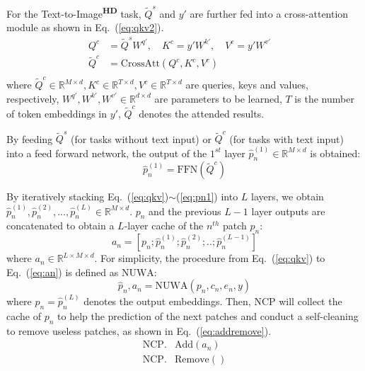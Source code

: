 \documentclass{article}
\begin{document}
For the Text-to-Image\textsuperscript{\textbf{HD}} task, $\tilde{Q}^s$ and $y'$ are further fed into a cross-attention module as shown in Eq.~(\ref{eq:qkv2}).
\begin{equation}\label{eq:qkv2}
\begin{split}
Q^c&=\tilde{Q}^sW^{q'},\quad 
K^c=y'W^{k'}, \quad
V^c=y'W^{v'} \quad \\
\tilde{Q}^c&=\text{CrossAtt}(Q^c, K^c, V^c) \\
\end{split}
\end{equation}
where $\tilde{Q}^c\in \mathbb{R}^{M\times d}, K^c\in \mathbb{R}^{T\times d}, V^c\in \mathbb{R}^{T\times d}$ are queries, keys and values, respectively, $W^{q'}, W^{k'}, W^{v'} \in \mathbb{R}^{d\times d}$ are parameters to be learned, $T$ is the number of token embeddings in $y'$, $\tilde{Q}^c$ denotes the attended results.

By feeding $\tilde{Q}^s$ (for tasks without text input) or $\tilde{Q}^c$ (for tasks with text input) into a feed forward network, the output of the $1^{st}$ layer $\hat{p}_n^{(1)}\in \mathbb{R}^{M\times d}$ is obtained:
\begin{equation}\label{eq:pn1}
\hat{p}_n^{(1)}=\text{FFN}(\tilde{Q}^c)
\end{equation}



By iteratively stacking Eq.~(\ref{eq:qkv})$\sim$(\ref{eq:pn1}) into $L$ layers, we obtain $\hat{p}_n^{(1)}, \hat{p}_n^{(2)}, ..., \hat{p}_n^{(L)}\in \mathbb{R}^{M\times d}$. $p_n$ and the previous $L-1$ layer outputs are concatenated to obtain a $L$-layer cache of the $n^{th}$ patch $p_n$:
\begin{equation}\label{eq:an}
a_n=[p_n;\hat{p}_n^{(1)};\hat{p}_n^{(2)};..;\hat{p}_n^{(L-1)}]
\end{equation}
where $a_n\in \mathbb{R}^{L\times M\times d}$. 
For simplicity, the procedure from Eq.~(\ref{eq:qkv}) to Eq.~(\ref{eq:an}) is defined as $\text{NUWA}$:
\begin{equation}\label{eq:nuwa}
\hat{p}_n, a_n=\text{NUWA}(p_n, c_n, e_n, y)
\end{equation}
where $\hat{p}_n=\hat{p}_n^{(L)}$ denotes the output embeddings. Then, NCP will collect the cache of $p_n$ to help the prediction of the next patches and conduct a self-cleaning to remove useless patches, as shown in Eq.~(\ref{eq:addremove}).
\begin{equation}\label{eq:addremove}
\begin{split}
    \text{NCP}.&\text{Add}(a_n)\\
    \text{NCP}.&\text{Remove}()\\
\end{split}
\end{equation}
\end{document}
